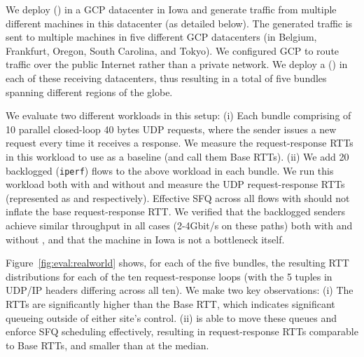 We deploy \name (\inbox) in a GCP datacenter in Iowa and generate traffic from multiple different machines in this datacenter (as detailed below). 
The generated traffic is sent to multiple machines in five different GCP datacenters (in Belgium, Frankfurt, Oregon, South Carolina, and Tokyo). We configured GCP to route traffic over the public Internet rather than a private network. 
We deploy a \name (\outbox) in each of these receiving datacenters, thus resulting in a total of five bundles spanning different regions of the globe.

We evaluate two different workloads in this setup: (i) Each bundle comprising of 10 parallel closed-loop 40 bytes UDP requests, where the sender issues a new request every time it receives a response. We measure the request-response RTTs in this workload to use as a baseline (and call them Base RTTs). (ii) We add 20 backlogged (\texttt{iperf}) flows to the above workload in each bundle. We run this workload both with and without \name and measure the UDP request-response RTTs (represented as \name and \baseline respectively). Effective SFQ across all flows with \name should not inflate the base request-response RTT.
We verified that the backlogged senders achieve similar throughput in all cases (2-4Gbit/s on these paths) both with and without \name, and that the \name machine in Iowa is not a bottleneck itself. 

Figure~\ref{fig:eval:realworld} shows, for each of the five bundles, the resulting RTT distributions for each of the ten request-response loops (with the 5 tuples in UDP/IP headers differing across all ten). 
We make two key observations: (i) The \baseline RTTs are significantly higher than the Base RTT, which indicates significant queueing outside of either site's control. (ii) \name is able to move these queues and enforce SFQ scheduling effectively, resulting in request-response RTTs comparable to Base RTTs, and \realworldMedianLatencyImprovement smaller than \baseline at the median.

